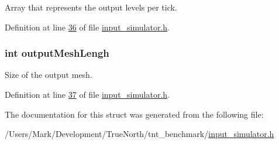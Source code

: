 Array that represents the output levels per tick. 



Definition at line \hyperlink{input__simulator_8h_source_l00036}{36} of file \hyperlink{input__simulator_8h_source}{input\+\_\+simulator.\+h}.

\hypertarget{structselected_spikes_a97727a3be0dbd5813f860c99733048a8}{}
\subsubsection[{output\+Mesh\+Lengh}]{\setlength{\rightskip}{0pt plus 5cm}int output\+Mesh\+Lengh}\label{structselected_spikes_a97727a3be0dbd5813f860c99733048a8}


Size of the output mesh. 



Definition at line \hyperlink{input__simulator_8h_source_l00037}{37} of file \hyperlink{input__simulator_8h_source}{input\+\_\+simulator.\+h}.



The documentation for this struct was generated from the following file\+:\begin{DoxyCompactItemize}
\item 
/\+Users/\+Mark/\+Development/\+True\+North/tnt\+\_\+benchmark/\hyperlink{input__simulator_8h}{input\+\_\+simulator.\+h}\end{DoxyCompactItemize}
